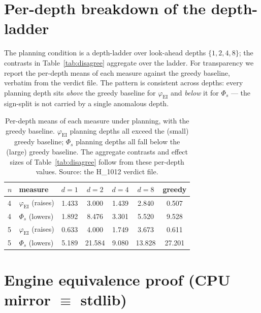 \documentclass[11pt,a4paper]{article}
\newcommand{\faithful}{\ensuremath{\varphi_{\mathrm{EI}}}}
\newcommand{\bigphi}{\ensuremath{\Phi_{s}}}
\begin{document}



\appendix

\section{Per-depth breakdown of the depth-ladder}
\label{app:depth}

The planning condition is a depth-ladder over look-ahead depths $\{1,2,4,8\}$;
the contrasts in Table~\ref{tab:disagree} aggregate over the ladder. For
transparency we report the per-depth means of each measure against the greedy
baseline, verbatim from the verdict file. The pattern is consistent across
depths: every planning depth sits \emph{above} the greedy baseline for
\faithful{} and \emph{below} it for \bigphi{} --- the sign-split is not carried
by a single anomalous depth.

\begin{table}[h]
\centering
\small
\begin{tabular}{llccccc}
\toprule
$n$ & measure & $d{=}1$ & $d{=}2$ & $d{=}4$ & $d{=}8$ & greedy \\
\midrule
4 & \faithful{} (raises) & 1.433 & 3.000 & 1.439 & 2.840 & 0.507 \\
4 & \bigphi{} (lowers)   & 1.892 & 8.476 & 3.301 & 5.520 & 9.528 \\
5 & \faithful{} (raises) & 0.633 & 4.000 & 1.749 & 3.673 & 0.611 \\
5 & \bigphi{} (lowers)   & 5.189 & 21.584 & 9.080 & 13.828 & 27.201 \\
\bottomrule
\end{tabular}
\caption{Per-depth means of each measure under planning, with the greedy
baseline. \faithful{} planning depths all exceed the (small) greedy baseline;
\bigphi{} planning depths all fall below the (large) greedy baseline. The
aggregate contrasts and effect sizes of Table~\ref{tab:disagree} follow from
these per-depth values. Source: the H\_1012 verdict file.}
\label{tab:depth}
\end{table}

\section{Engine equivalence proof (CPU mirror $\equiv$ stdlib)}
\label{app:equiv}
\end{document}
